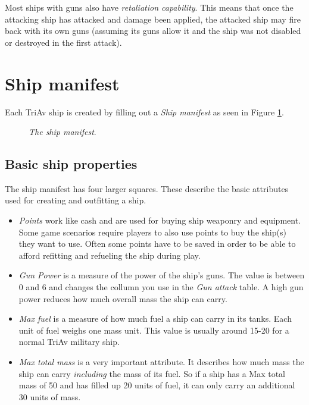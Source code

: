 \documentclass[a4paper,12pt,notitlepage,twocolumn]{article}
\begin{document}
Most ships with guns also have \emph{retaliation
  capability}. This means that once the attacking ship has attacked
and damage been applied, the attacked ship may fire back with its own
guns (assuming its guns allow it and the ship was not disabled or
destroyed in the first attack).   

\section{Ship manifest}
\label{sec:ship_manifest}

Each TriAv ship is created by filling out a \emph{Ship
  manifest} as seen in Figure \ref{fig:12}. 

\begin{figure}[h!]\centering 
  \caption{\footnotesize \emph{The ship manifest}. } 
\label{fig:12}
\end{figure}

\subsection{Basic ship properties}

The ship manifest has four larger squares. These describe the basic
attributes used for creating and outfitting a ship. 
\begin{itemize}
\item \emph{Points} work like cash and are used for buying ship weaponry
  and equipment. Some game scenarios require players to also use points to
  buy the ship(s) they want to use. Often some points have to be saved in
  order to be able to afford refitting and refueling the ship during play. 
\item \emph{Gun Power} is a measure of the power of the ship's
  guns. The value is between 0 and 6 and changes the collumn you use
  in the \emph{Gun attack} table. A high gun power reduces how much
  overall mass the ship can carry.
\item \emph{Max fuel} is a measure of how much fuel a ship can carry 
  in its tanks. Each unit of fuel weighs one mass unit. This value is
  usually around 15-20 for a normal TriAv military ship.   
\item \emph{Max total mass} is a very important attribute. It
  describes how much mass the ship can carry \emph{including}
  the mass of its fuel. So if a ship has a Max total mass of 50 and
  has filled up 20 units of fuel, it can only carry an additional 30
  units of mass. 
\end{itemize}
\end{document}
